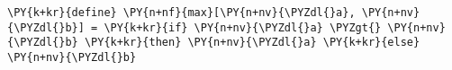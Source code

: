 \begin{Verbatim}[commandchars=\\\{\}]
\PY{k+kr}{define} \PY{n+nf}{max}[\PY{n+nv}{\PYZdl{}a}, \PY{n+nv}{\PYZdl{}b}] = \PY{k+kr}{if} \PY{n+nv}{\PYZdl{}a} \PYZgt{} \PY{n+nv}{\PYZdl{}b} \PY{k+kr}{then} \PY{n+nv}{\PYZdl{}a} \PY{k+kr}{else} \PY{n+nv}{\PYZdl{}b}
\end{Verbatim}
